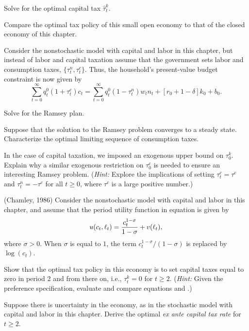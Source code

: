 \medskip
{} Solve for the optimal capital tax $\hat \tau^k_t$.

\medskip
{} Compare the optimal tax policy of this small open
economy to that of the closed economy of this chapter.

\vfil\eject
\medskip
{} 
\medskip
\noindent
Consider the nonstochastic model with capital and labor in this
chapter, but instead of labor and capital taxation assume that the
government sets labor and consumption taxes, $\{\tau^n_t, \tau^c_t\}$.
Thus, the household's present-value budget constraint is now given by
$$
\sum_{t=0}^\infty q^0_t (1+\tau^c_t) c_t =
\sum_{t=0}^\infty q^0_t (1-\tau^n_t) w_t n_t
   + \left[r_{0} + 1-\delta \right] k_0 + b_0.
$$

\medskip
{} Solve for the Ramsey plan.

\medskip
{} Suppose that the solution to the Ramsey problem converges
to a steady state.
Characterize the optimal limiting sequence of consumption taxes.

\medskip
{} In the case of capital taxation, we imposed an
exogenous upper bound on $\tau^k_0$. Explain why a similar exogenous
restriction on $\tau^c_0$ is needed to ensure an interesting
Ramsey problem. ({\it Hint:} Explore the implications of setting
$\tau^c_t=\tau^c$ and $\tau^n_t=-\tau^c$ for all $t\geq 0$,
where $\tau^c$ is a large positive number.)


\medskip
{}  (Chamley, 1986)
\medskip
\noindent
Consider the nonstochastic model with capital and labor in this
chapter, and assume that the period utility function in equation 
is given by
$$
u(c_t,\ell_t) = {c_t^{1-\sigma} \over 1-\sigma} + v(\ell_t),
$$
where $\sigma>0$. When $\sigma$ is equal to $1$, the term
$c_t^{1-\sigma} / (1-\sigma)$ is replaced by $\log (c_t)$.

\medskip
{} Show that the optimal tax policy in this economy is to set
capital taxes equal to zero in period 2 and from there on, i.e.,
$\tau^k_t=0$ for $t\geq 2$. ({\it Hint:} Given the preference specification,
evaluate and compare equations  and .)

\medskip
{} Suppose there is uncertainty in the economy, as
in the stochastic model with capital and labor in this chapter.
Derive the optimal {\it ex ante capital tax rate\/} for $t\geq 2$.

